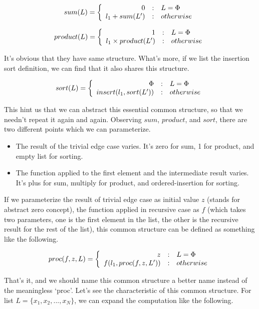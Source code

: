 \documentclass{article}
\begin{document}
\[
sum(L) =  \left \{
  \begin{array}
  {r@{\quad:\quad}l}
  0 & L = \Phi \\
  l_1 + sum(L') & otherwise
  \end{array}
\right.
\]

\[
product(L) = \left \{
  \begin{array}
  {r@{\quad:\quad}l}
  1 & L = \Phi \\
  l_1 \times product(L') & otherwise
  \end{array}
\right.
\]

It's obvious that they have same structure. What's more, if we list the insertion sort definition, we can
find that it also shares this structure.

\[
sort(L) = \left \{
  \begin{array}
  {r@{\quad:\quad}l}
  \Phi & L = \Phi \\
  insert(l_1, sort(L')) & otherwise
  \end{array}
\right.
\]

This hint us that we can abstract this essential common structure, so that we needn't repeat it again and again.
Observing $sum$, $product$, and $sort$, there are two different points which we can parameterize.

\begin{itemize}
\item The result of the trivial edge case varies. It's zero for sum, 1 for product, and empty list for sorting.
\item The function applied to the first element and the intermediate result varies. It's plus for sum, multiply for product,
and ordered-insertion for sorting.
\end{itemize}

If we parameterize the result of trivial edge case as initial value $z$ (stands for abstract zero concept), the
function applied in recursive case as $f$ (which takes two parameters, one is the first element in the list, 
the other is the recursive result for the rest of the list), this common structure can be defined as something
like the following.

\[
proc(f, z, L) = \left \{
  \begin{array}
  {r@{\quad:\quad}l}
  z & L = \Phi \\
  f(l_1, proc(f, z, L')) & otherwise
  \end{array}
\right.
\]

That's it, and we should name this common structure a better name instead of the meaningless `proc'. Let's
see the characteristic of this common structure. For list $L = \{x_1, x_2, ..., x_N \}$, we can expand the 
computation like the following.
\end{document}
